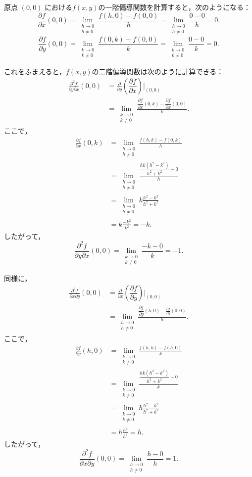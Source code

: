 \begin{tanswer}
原点 $(0,0)$ における$f(x,y)$の一階偏導関数を計算すると，次のようになる：
\[
\frac{\partial f}{\partial x}(0,0) = \lim_{\substack{h \to 0 \\ h \ne 0}}\frac{f(h,0)-f(0,0)}{h} = \lim_{\substack{h \to 0 \\ h \ne 0}}\frac{0-0}{h} = 0.
\]
\[
\frac{\partial f}{\partial y}(0,0) = \lim_{\substack{k \to 0 \\ k \ne 0}}\frac{f(0,k)-f(0,0)}{k} = \lim_{\substack{k \to 0 \\ k \ne 0}}\frac{0-0}{k} = 0.
\]

これをふまえると，$f(x,y)$の二階偏導関数は次のように計算できる：
\begin{align*}
\frac{\partial^2 f}{\partial y \partial x}(0,0) &= \frac{\partial}{\partial y}\left(\dfrac{\partial f}{\partial x}\right)\Biggr|_{(0,0)}\\
&= \lim_{\substack{k \to 0 \\ k \ne 0}}\frac{\dfrac{\partial f}{\partial x}(0,k) - \dfrac{\partial f}{\partial x}(0,0)}{k}.
\end{align*}
ここで，
\begin{align*}
\frac{\partial f}{\partial x}(0,k) &= \lim_{\substack{h \to 0 \\ h \ne 0}}\frac{f(h,k) - f(0,k)}{h} \\
&= \lim_{\substack{h \to 0 \\ h \ne 0}}\frac{\dfrac{hk(h^2-k^2)}{h^2+k^2} - 0}{h} \\
&= \lim_{\substack{h \to 0 \\ h \ne 0}} k \frac{h^2-k^2}{h^2+k^2} \\
&= k \frac{-k^2}{k^2} = -k.
\end{align*}
したがって，
\[
\frac{\partial^2 f}{\partial y \partial x}(0,0) = \lim_{\substack{k \to 0 \\ k \ne 0}}\frac{-k - 0}{k} = -1.
\]

同様に，
\begin{align*}
\frac{\partial^2 f}{\partial x \partial y}(0,0) &= \frac{\partial}{\partial x}\left(\dfrac{\partial f}{\partial y}\right)\Biggr|_{(0,0)} \\
&= \lim_{\substack{h \to 0 \\ h \ne 0}}\frac{\dfrac{\partial f}{\partial y}(h,0) - \frac{\partial f}{\partial y}(0,0)}{h}.
\end{align*}
ここで，
\begin{align*}
\frac{\partial f}{\partial y}(h,0) &= \lim_{\substack{k \to 0 \\ k \ne 0}}\frac{f(h,k) - f(h,0)}{k} \\
&= \lim_{\substack{k \to 0 \\ k \ne 0}}\frac{\dfrac{hk(h^2-k^2)}{h^2+k^2} - 0}{k} \\
&= \lim_{\substack{k \to 0 \\ k \ne 0}} h \frac{h^2-k^2}{h^2+k^2} \\
&= h \frac{h^2}{h^2} = h.
\end{align*}
したがって，
\[
\frac{\partial^2 f}{\partial x \partial y}(0,0) = \lim_{\substack{h \to 0 \\ h \ne 0}}\frac{h - 0}{h} = 1.
\]


\end{tanswer}
